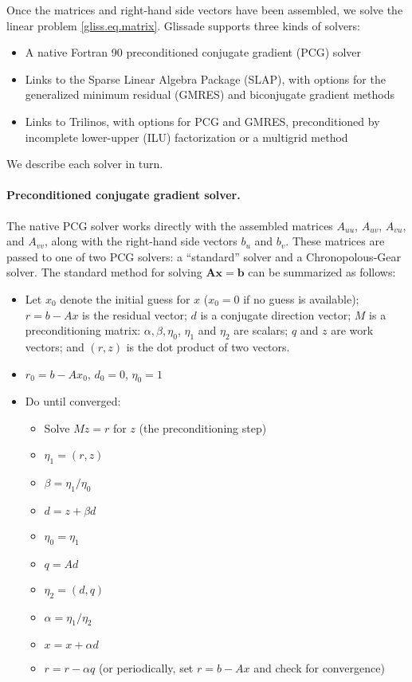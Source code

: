 Once the matrices and right-hand side vectors have been assembled, we solve the linear problem
\eqref{gliss.eq.matrix}.  Glissade supports three kinds of solvers:

\begin{itemize}
\item A native Fortran 90 preconditioned conjugate gradient (PCG) solver
\item Links to the Sparse Linear Algebra Package (SLAP), with options for 
the generalized minimum residual (GMRES) and biconjugate gradient methods
\item Links to Trilinos, with options for PCG and GMRES, preconditioned by
incomplete lower-upper (ILU) factorization or a multigrid method
\end{itemize}

We describe each solver in turn.

\paragraph{Preconditioned conjugate gradient solver.}

The native PCG solver works directly with the assembled matrices
$A_{uu}$, $A_{uv}$, $A_{vu}$, and $A_{vv}$, along with the right-hand side vectors
$b_u$ and $b_v$.  These matrices are passed to one of two PCG solvers:
a ``standard'' solver and a Chronopolous-Gear solver.  The standard method 
for solving $\mathbf{Ax} = \mathbf{b}$ can be summarized as follows:

\begin{itemize}

\item Let $x_0$ denote the initial guess for $x$ ($x_0 = 0$ if no guess is available);
$r = b - Ax$ is the residual vector; $d$ is a conjugate direction vector;
$M$ is a preconditioning matrix: $\alpha, \beta, \eta_0$, $\eta_1$ and $\eta_2$ are scalars;
$q$ and $z$ are work vectors; and $(r,z)$ is the dot product of two vectors.

\item $r_0 = b - A x_0$, $d_0 = 0$, $\eta_0 = 1$ 

\item Do until converged:
  \begin{itemize}
\renewcommand{\labelitemii}{$\star$}
  \item Solve $M z = r$ for $z$ (the preconditioning step)
  \item $\eta_1 = (r,z)$
  \item $\beta = \eta_1/\eta_0$
  \item $d = z + \beta d$
  \item $\eta_0 = \eta_1$
  \item $q = A d$
  \item $\eta_2 = (d,q)$
  \item $\alpha = \eta_1/\eta_2$
  \item $x = x + \alpha d$
  \item $r = r - \alpha q$ (or periodically, set $r = b - A x$ and check for convergence)
  \end{itemize}
\end{itemize}

